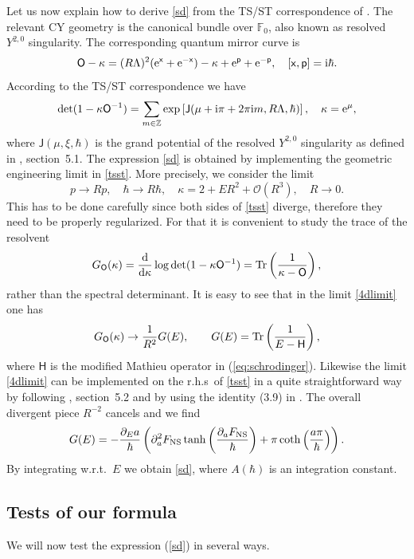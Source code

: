\documentclass[a4paper,11pt]{article}
\theoremstyle{definition}
\def\IZ{{\mathbb Z}}
\def\IF{{\mathbb F}}
\newcommand{\re}{{\rm e}}
\newcommand{\ri}{{\rm i}}
\newcommand{\rd}{{\rm d}}
\newcommand{\Tr}{{\rm Tr}}
\newcommand{\mO}{\mathsf{O}}
\newcommand{\mH}{\mathsf{H}}
\newcommand{\mJ}{\mathsf{J}}
\newcommand{\be}{\begin{equation}}
\newcommand{\ee}{\end{equation}}
\newcommand{\ba}{\begin{aligned}}
\newcommand{\ea}{\end{aligned}}
\def\IF{\mathbb{F}}
\def\IZ{\mathbb{Z}}
\begin{document}
Let us now explain how to
derive \eqref{sd} from the TS/ST correspondence of \cite{ghm,cgm}. The relevant CY geometry is the
canonical bundle over $\IF_0$, also known as resolved $Y^{2,0}$
singularity.  The corresponding quantum mirror curve is
%
\begin{equation}
\mO-\kappa=(R \Lambda)^2(\re^{\mathsf x}+\re^{-\mathsf
    x})-\kappa+\re^{\mathsf p}+\re^{-\mathsf p},  \quad [\mathsf x,
  \mathsf p]=\ri  \hbar.
\end{equation}
%
According to the TS/ST correspondence we have
%
\begin{equation}
  \label{tsst} \det (1-\kappa \mO^{-1})=\sum_{ { m}
    \in \IZ} \exp\left[\mJ ( {\mu+\ri \pi+2 \pi \ri m},R\Lambda,
    \hbar)\right], \quad \kappa=\re^{\mu},
\end{equation}
%
where $\mJ ( {\mu},\xi, \hbar)$ is the grand potential of the resolved $Y^{2,0}$ singularity as defined in \cite{gm3}, section~5.1.
%
The expression  \eqref{sd}  is obtained by implementing  the geometric engineering limit \cite{selfdual,kkv} in \eqref{tsst}. 
More precisely, we consider the limit 
%
\be\label{4dlimit} p\to R p, \quad\hbar\to R\hbar, \quad \kappa=2+E R^2+\mathcal{O}(R^3), \quad R\to 0.\ee
%
This has to be done carefully since both sides of \eqref{tsst} diverge, therefore they need to be properly regularized. 
For that it is convenient to study the trace of the resolvent
%
\be 
G_\mO (\kappa)={\rd \over \rd \kappa} \log \det (1-\kappa \mO^{-1})={\rm Tr} \left({1\over \kappa- \mO}\right), 
 \ee
%
rather than the spectral determinant. It is easy to see that in the limit \eqref{4dlimit} one has
%
\be  G_\mO (\kappa) \to {1\over R^2} G(E), \qquad G(E)= \Tr\left({1\over E-\mH}\right),
\ee
%
where $\mH$ is the modified Mathieu operator in (\ref{eq:schrodinger}). 
%
Likewise the limit \eqref{4dlimit} can be implemented on the r.h.s~of \eqref{tsst} in a quite 
straightforward way by following \cite{gm3}, section~5.2 and by using the identity (3.9) in \cite{bgt}. 
The overall divergent piece $R^{-2}$ cancels and we find
%
\be 
\ba 
G(E)=-{\partial_E a \over \hbar}\left(\partial_a^2 F_{\rm NS}\tanh\left({\partial_a F_{\rm NS}\over \hbar}\right)+\pi \coth\left({a\pi\over \hbar}\right)\right).
\ea\ee
%
 By integrating w.r.t.~$E$ we obtain \eqref{sd}, where $A(\hbar)$ is an integration constant. 


\subsection{Tests of our formula}
We will now test the expression (\ref{sd}) in several ways. 
\end{document}
